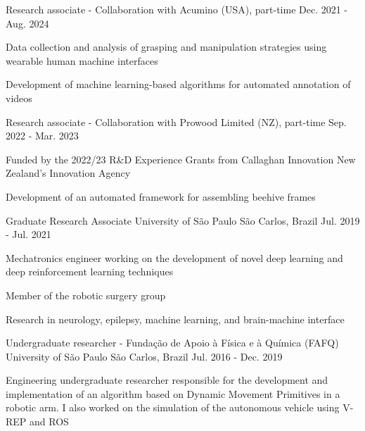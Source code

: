 \begin{cventries}
  \cventry
    {Research associate - Collaboration with Acumino (USA), part-time} %
    {} %
    {} %
    {Dec. 2021 - Aug. 2024} %
    {
      \begin{cvitems} %
        \item {Data collection and analysis of grasping and manipulation strategies using wearable human machine interfaces}
        \item {Development of machine learning-based algorithms for automated annotation of videos}
      \end{cvitems}
    }
\vspace{-5pt} 

  \cventry
    {Research associate - Collaboration with Prowood Limited (NZ), part-time} %
    {} %
    {} %
    {Sep. 2022 - Mar. 2023} %
    {
      \begin{cvitems} %
        \item {Funded by the 2022/23 R\&D Experience Grants from Callaghan Innovation New Zealand's Innovation Agency}
        \item {Development of an automated framework for assembling beehive frames}
      \end{cvitems}
    }


    
  \cventry
    {Graduate Research Associate} %
    {University of São Paulo} %
    {São Carlos, Brazil} %
    {Jul. 2019 - Jul. 2021} %
    {
      \begin{cvitems} %
        \item {Mechatronics engineer working on the development of novel deep learning and deep reinforcement learning techniques}
        \item {Member of the robotic surgery group}
        \item {Research in neurology, epilepsy, machine learning, and brain-machine interface}
      \end{cvitems}
    }
    

  \cventry
    {Undergraduate researcher - Fundação de Apoio à
Física e à Química (FAFQ)} %
    {University of São Paulo} %
    {São Carlos, Brazil} %
    {Jul. 2016 - Dec. 2019} %
    {
      \begin{cvitems} %
        \item {Engineering undergraduate researcher responsible for the development and implementation of an algorithm based on Dynamic Movement Primitives in a robotic arm. I also worked on the simulation of the autonomous vehicle using V-REP and ROS}
      \end{cvitems}
    }     
    


\end{cventries}
